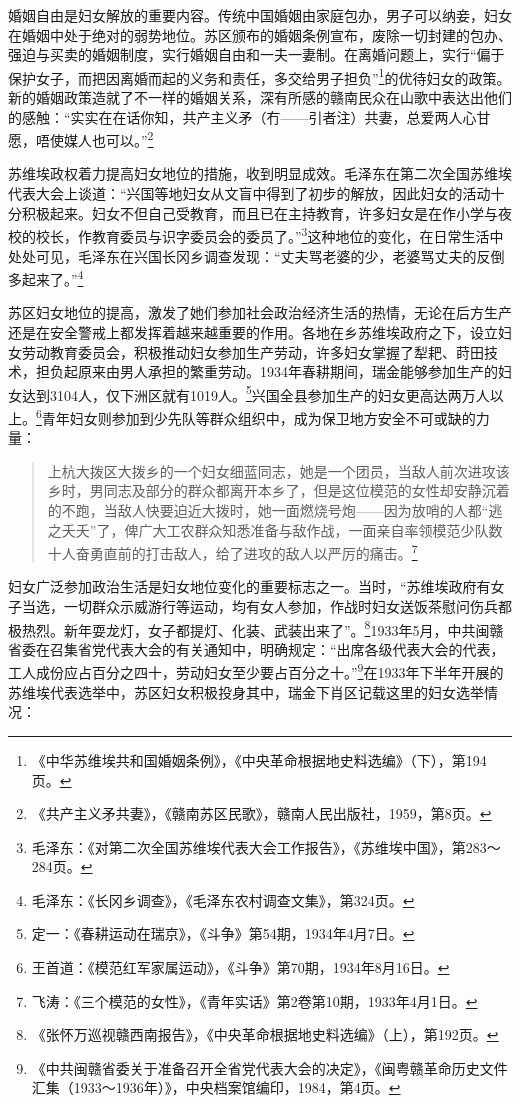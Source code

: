 婚姻自由是妇女解放的重要内容。传统中国婚姻由家庭包办，男子可以纳妾，妇女在婚姻中处于绝对的弱势地位。苏区颁布的婚姻条例宣布，废除一切封建的包办、强迫与买卖的婚姻制度，实行婚姻自由和一夫一妻制。在离婚问题上，实行“偏于保护女子，而把因离婚而起的义务和责任，多交给男子担负”\footnote{《中华苏维埃共和国婚姻条例》，《中央革命根据地史料选编》（下），第194页。}的优待妇女的政策。新的婚姻政策造就了不一样的婚姻关系，深有所感的赣南民众在山歌中表达出他们的感触：“实实在在话你知，共产主义矛（冇——引者注）共妻，总爱两人心甘愿，唔使媒人也可以。”\footnote{《共产主义矛共妻》，《赣南苏区民歌》，赣南人民出版社，1959，第8页。}


苏维埃政权着力提高妇女地位的措施，收到明显成效。毛泽东在第二次全国苏维埃代表大会上谈道：“兴国等地妇女从文盲中得到了初步的解放，因此妇女的活动十分积极起来。妇女不但自己受教育，而且已在主持教育，许多妇女是在作小学与夜校的校长，作教育委员与识字委员会的委员了。”\footnote{毛泽东：《对第二次全国苏维埃代表大会工作报告》，《苏维埃中国》，第283～284页。}这种地位的变化，在日常生活中处处可见，毛泽东在兴国长冈乡调查发现：“丈夫骂老婆的少，老婆骂丈夫的反倒多起来了。”\footnote{毛泽东：《长冈乡调查》，《毛泽东农村调查文集》，第324页。}


苏区妇女地位的提高，激发了她们参加社会政治经济生活的热情，无论在后方生产还是在安全警戒上都发挥着越来越重要的作用。各地在乡苏维埃政府之下，设立妇女劳动教育委员会，积极推动妇女参加生产劳动，许多妇女掌握了犁耙、莳田技术，担负起原来由男人承担的繁重劳动。1934年春耕期间，瑞金能够参加生产的妇女达到3104人，仅下洲区就有1019人。\footnote{定一：《春耕运动在瑞京》，《斗争》第54期，1934年4月7日。}兴国全县参加生产的妇女更高达两万人以上。\footnote{王首道：《模范红军家属运动》，《斗争》第70期，1934年8月16日。}青年妇女则参加到少先队等群众组织中，成为保卫地方安全不可或缺的力量：

\begin{quote}

上杭大拨区大拨乡的一个妇女细蓝同志，她是一个团员，当敌人前次进攻该乡时，男同志及部分的群众都离开本乡了，但是这位模范的女性却安静沉着的不跑，当敌人快要迫近大拨时，她一面燃烧号炮——因为放哨的人都“逃之夭夭”了，俾广大工农群众知悉准备与敌作战，一面亲自率领模范少队数十人奋勇直前的打击敌人，给了进攻的敌人以严厉的痛击。\footnote{飞涛：《三个模范的女性》，《青年实话》第2卷第10期，1933年4月1日。}
\end{quote}


妇女广泛参加政治生活是妇女地位变化的重要标志之一。当时，“苏维埃政府有女子当选，一切群众示威游行等运动，均有女人参加，作战时妇女送饭茶慰问伤兵都极热烈。新年耍龙灯，女子都提灯、化装、武装出来了”。\footnote{《张怀万巡视赣西南报告》，《中央革命根据地史料选编》（上），第192页。}1933年5月，中共闽赣省委在召集省党代表大会的有关通知中，明确规定：“出席各级代表大会的代表，工人成份应占百分之四十，劳动妇女至少要占百分之十。”\footnote{《中共闽赣省委关于准备召开全省党代表大会的决定》，《闽粤赣革命历史文件汇集（1933～1936年）》，中央档案馆编印，1984，第4页。}在1933年下半年开展的苏维埃代表选举中，苏区妇女积极投身其中，瑞金下肖区记载这里的妇女选举情况：

